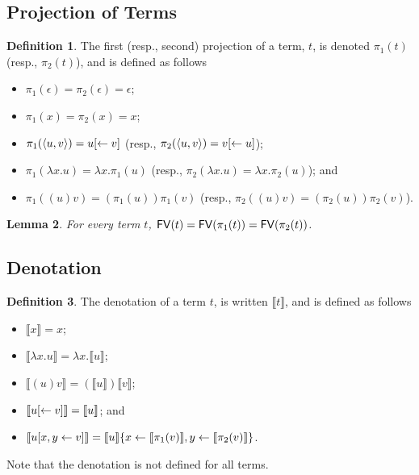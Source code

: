 \documentclass[11pt,a4paper]{article}
\theoremstyle{definition}
\newtheorem{definition}{Definition}
\theoremstyle{plain}
\newtheorem{lemma}[definition]{Lemma}
\theoremstyle{remark}
\begin{document}
\subsection{Projection of Terms}

\begin{definition}
	The first (resp., second) projection of a term, $t$, is denoted $\pi_1(t)$ (resp., $\pi_2(t)$), and is defined as follows
	\begin{itemize}
		\item $\pi_1(\epsilon)=\pi_2(\epsilon)=\epsilon$;
		\item $\pi_1(x)=\pi_2(x)=x$;
		\item $\pi_1({\langle{u},{v}\rangle})=u{[\leftarrow{v}]}$ (resp., $\pi_2({\langle{u},{v}\rangle})=v{[\leftarrow{u}]}$);
		\item $\pi_1(\lambda x.u)=\lambda x.\pi_1(u)$ (resp., $\pi_2(\lambda x.u)=\lambda x.\pi_2(u)$); and
		\item $\pi_1( (u)v)=(\pi_1(u))\pi_1(v)$ (resp., $\pi_2( (u)v)=(\pi_2(u))\pi_2(v)$).
	\end{itemize}
\end{definition}

\begin{lemma}
For every term $t$, ${\mathop{\mathsf{FV}}}(t)={\mathop{\mathsf{FV}}}(\pi_1(t))={\mathop{\mathsf{FV}}}(\pi_2(t))$.
\end{lemma}

\subsection{Denotation}

\newcommand{\terden}[1]{{\llbracket{#1}\rrbracket}}

\begin{definition}
	The denotation of a term $t$, is written $\terden{t}$, and is defined as follows
	\begin{itemize}
		\item $\terden{x}=x$;
		\item $\terden{\lambda x. u}=\lambda x.\terden{u}$;
		\item $\terden{(u)v}=(\terden{u})\terden{v}$;
		\item $\terden{u\terdel{v}}=\terden{u}$; and
		\item $\terden{u\terdup{x}{y}{v}}=\terden{u}\{x\leftarrow \terden{\pi_1(v)},y\leftarrow\terden{\pi_2(v)}\}$.
\end{itemize}
\end{definition}

Note that the denotation is not defined for all terms.
\end{document}
